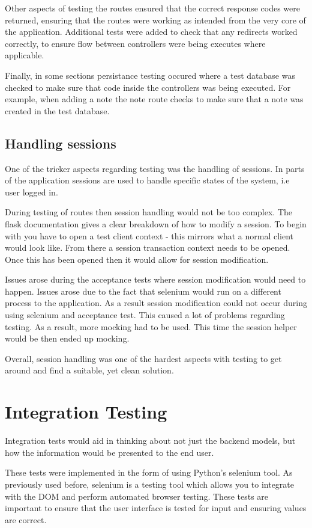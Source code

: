 Other aspects of testing the routes ensured that the correct response codes were returned, ensuring that the routes were working as intended from the very core of the application. Additional tests were added to check that any redirects worked correctly, to ensure flow between controllers were being executes where applicable.

Finally, in some sections persistance testing occured where a test database was checked to make sure that code inside the controllers was being executed. For example, when adding a note the note route checks to make sure that a note was created in the test database.

\subsection{Handling sessions}
One of the tricker aspects regarding testing was the handling of sessions. In parts of the application sessions are used to handle specific states of the system, i.e user logged in.

During testing of routes then session handling would not be too complex. The flask documentation gives a clear breakdown of how to modify a session. To begin with you have to open a test client context - this mirrors what a normal client would look like. From there a session transaction context needs to be opened. Once this has been opened then it would allow for session modification.

Issues arose during the acceptance tests where session modification would need to happen. Issues arose due to the fact that selenium would run on a different process to the application. As a result session modification could not occur during using selenium and acceptance test. This caused a lot of problems regarding testing. As a result, more mocking had to be used. This time the session helper would be then ended up mocking.

Overall, session handling was one of the hardest aspects with testing to get around and find a suitable, yet clean solution.

\section{Integration Testing}
Integration tests would aid in thinking about not just the backend models, but how the information would be presented to the end user.

These tests were implemented in the form of using Python's selenium tool. As previously used before, selenium is a testing tool which allows you to integrate with the DOM and perform automated browser testing. These tests are important to ensure that the user interface is tested for input and ensuring values are correct.

